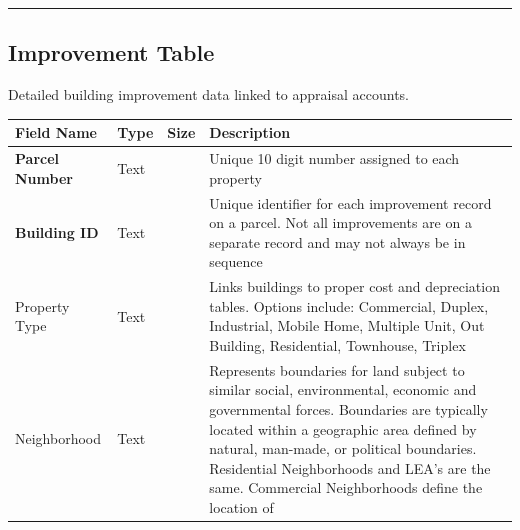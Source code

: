 \documentclass[
  english,
  letterpaper,
  DIV=11,
  numbers=noendperiod]{scrreprt}
\newcounter{none} %
\begin{document}
\begin{center}\rule{0.5\linewidth}{0.5pt}\end{center}

\subsection{Improvement Table}\label{improvement-table}

Detailed building improvement data linked to appraisal accounts.

{\def\LTcaptype{none} %
\begin{longtable}[]{@{}
  >{\raggedright\arraybackslash}p{}
  >{\raggedright\arraybackslash}p{}
  >{\raggedright\arraybackslash}p{}
  >{\raggedright\arraybackslash}p{}@{}}
\toprule\noalign{}
\begin{minipage}[b]{\linewidth}\raggedright
Field Name
\end{minipage} & \begin{minipage}[b]{\linewidth}\raggedright
Type
\end{minipage} & \begin{minipage}[b]{\linewidth}\raggedright
Size
\end{minipage} & \begin{minipage}[b]{\linewidth}\raggedright
Description
\end{minipage} \\
\midrule\noalign{}
\endhead
\bottomrule\noalign{}
\endlastfoot
\textbf{Parcel Number} & Text & 10 & Unique 10 digit number assigned to
each property \\
\textbf{Building ID} & Text & 5 & Unique identifier for each improvement
record on a parcel. Not all improvements are on a separate record and
may not always be in sequence \\
Property Type & Text & 15 & Links buildings to proper cost and
depreciation tables. Options include: Commercial, Duplex, Industrial,
Mobile Home, Multiple Unit, Out Building, Residential, Townhouse,
Triplex \\
Neighborhood & Text & 10 & Represents boundaries for land subject to
similar social, environmental, economic and governmental forces.
Boundaries are typically located within a geographic area defined by
natural, man-made, or political boundaries. Residential Neighborhoods
and LEA's are the same. Commercial Neighborhoods define the location of

\end{longtable}}
\end{document}
